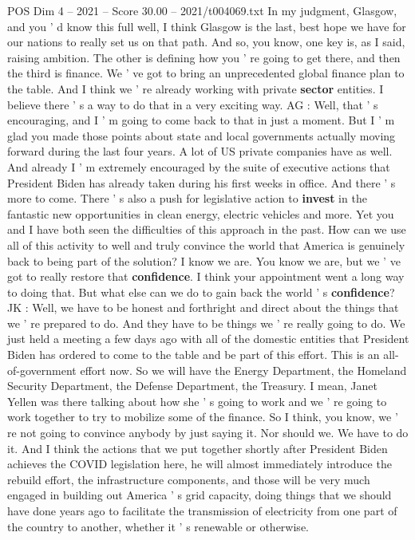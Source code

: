 \begin{textsample}{POS Dim 4 – 2021 – Score 30.00 – 2021/t004069.txt}
In my judgment, Glasgow, and you ' d know this full well, I think Glasgow is the last, best hope we have for our nations to really set us on that path.
And so, you know, one key is, as I said, raising ambition.
The other is defining how you ' re going to get there, and then the third is finance.
We ' ve got to bring an unprecedented global finance plan to the table.
And I think we ' re already working with private \textbf{sector} entities.
I believe there ' s a way to do that in a very exciting way.
AG : Well, that ' s encouraging, and I ' m going to come back to that in just a moment.
But I ' m glad you made those points about state and local governments actually moving forward during the last four years.
A lot of US private companies have as well.
And already I ' m extremely encouraged by the suite of executive actions that President Biden has already taken during his first weeks in office.
And there ' s more to come.
There ' s also a push for legislative action to \textbf{invest} in the fantastic new opportunities in clean energy, electric vehicles and more.
Yet you and I have both seen the difficulties of this approach in the past.
How can we use all of this activity to well and truly convince the world that America is genuinely back to being part of the solution?
I know we are.
You know we are, but we ' ve got to really restore that \textbf{confidence}.
I think your appointment went a long way to doing that.
But what else can we do to gain back the world ' s \textbf{confidence}?
JK : Well, we have to be honest and forthright and direct about the things that we ' re prepared to do.
And they have to be things we ' re really going to do.
We just held a meeting a few days ago with all of the domestic entities that President Biden has ordered to come to the table and be part of this effort.
This is an all-of-government effort now.
So we will have the Energy Department, the Homeland Security Department, the Defense Department, the Treasury.
I mean, Janet Yellen was there talking about how she ' s going to work and we ' re going to work together to try to mobilize some of the finance.
So I think, you know, we ' re not going to convince anybody by just saying it.
Nor should we.
We have to do it.
And I think the actions that we put together shortly after President Biden achieves the COVID legislation here, he will almost immediately introduce the rebuild effort, the infrastructure components, and those will be very much engaged in building out America ' s grid capacity, doing things that we should have done years ago to facilitate the transmission of electricity from one part of the country to another, whether it ' s renewable or otherwise.

\end{textsample}
